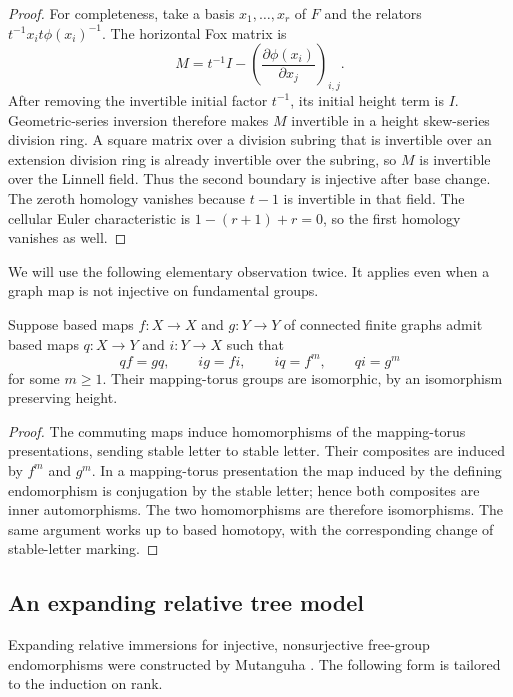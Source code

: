 \begin{proof}
For completeness, take a basis $x_1,\ldots,x_r$ of $F$ and the relators
$t^{-1}x_it\phi(x_i)^{-1}$. The horizontal Fox matrix is
\[
 M=t^{-1}I-\left(\frac{\partial\phi(x_i)}{\partial x_j}\right)_{i,j}.
\]
After removing the invertible initial factor $t^{-1}$, its initial
height term is $I$. Geometric-series inversion therefore makes $M$
invertible in a height skew-series division ring. A square matrix over a
division subring that is invertible over an extension division ring is
already invertible over the subring, so $M$ is invertible over the
Linnell field. Thus the second boundary is injective after base change.
The zeroth homology vanishes because $t-1$ is invertible in that field.
The cellular Euler characteristic is $1-(r+1)+r=0$, so the first homology
vanishes as well.
\end{proof}

We will use the following elementary observation twice. It applies even
when a graph map is not injective on fundamental groups.

\begin{lemma}\label{asc:shift-equivalence}
Suppose based maps $f:X\to X$ and $g:Y\to Y$ of connected finite graphs
admit based maps $q:X\to Y$ and $i:Y\to X$ such that
\[
 qf=gq,\qquad ig=fi,\qquad iq=f^m,\qquad qi=g^m
\]
for some $m\ge1$. Their mapping-torus groups are isomorphic, by an
isomorphism preserving height.
\end{lemma}

\begin{proof}
The commuting maps induce homomorphisms of the mapping-torus
presentations, sending stable letter to stable letter. Their composites
are induced by $f^m$ and $g^m$. In a mapping-torus presentation the map
induced by the defining endomorphism is conjugation by the stable letter;
hence both composites are inner automorphisms. The two homomorphisms are
therefore isomorphisms. The same argument works up to based homotopy,
with the corresponding change of stable-letter marking.
\end{proof}

\subsection{An expanding relative tree model}

Expanding relative immersions for injective, nonsurjective free-group
endomorphisms
were constructed by Mutanguha
\cite[Proposition~4.1 and Theorem~4.5]{Mutanguha2021Dynamics}.
The following form is tailored to the induction on rank.

